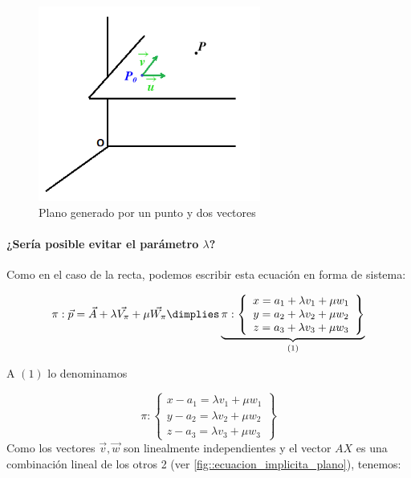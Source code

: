 \begin{figure}[hptb]
    \centering
    \includegraphics[width=0.65\textwidth]{img/ecplanos.png}
    \caption{Plano generado por un punto y dos vectores}
    \label{fig:plano}
\end{figure}


\paragraph{¿Sería posible evitar el parámetro $\lambda$?} Como en el caso de la recta, podemos escribir esta ecuación en forma de sistema:

$$\pi : \vec{p} = \vec{A} + \lambda \vec{V_{\pi}} + \mu\vec{W_{\pi}}\dimplies \underbrace{\pi:\displaystyle \left\{\begin{array}{c} x = a_1 + \lambda v_1 + \mu w_1\\y = a_2 + \lambda v_2 + \mu w_2 \\ z = a_3 + \lambda v_3 + \mu w_3 \end{array}\right\}}_{(1)} $$

 A $(1)$ lo denominamos 

\[
\pi:\displaystyle \left\{
\begin{array}{c} 
x - a_1 = \lambda v_1 + \mu w_1\\
y - a_2 = \lambda v_2 + \mu w_2 \\ 
z - a_3 = \lambda v_3 + \mu w_3 
\end{array}\right\}
\]
Como los vectores $\vec{v},\vec{w}$ son linealmente independientes y el vector $AX$ es una combinación lineal de los otros 2 (ver \ref{fig::ecuacion_implicita_plano}), tenemos:


